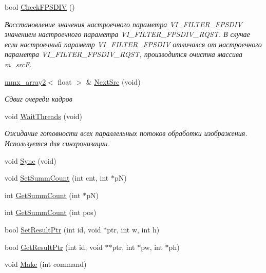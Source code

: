\begin{DoxyCompactItemize}
bool \hyperlink{class_c_v_i_engine_base_a4764b56d4269ed5cd101dddf545e039d}{Check\+F\+P\+S\+D\+I\+V} ()
\begin{DoxyCompactList}\small\item\em Восстановление значения настроечного параметра V\+I\+\_\+\+F\+I\+L\+T\+E\+R\+\_\+\+F\+P\+S\+D\+I\+V значением настроечного параметра V\+I\+\_\+\+F\+I\+L\+T\+E\+R\+\_\+\+F\+P\+S\+D\+I\+V\+\_\+\+R\+Q\+S\+T. В случае если настроечный параметр V\+I\+\_\+\+F\+I\+L\+T\+E\+R\+\_\+\+F\+P\+S\+D\+I\+V отличался от настроечного параметра V\+I\+\_\+\+F\+I\+L\+T\+E\+R\+\_\+\+F\+P\+S\+D\+I\+V\+\_\+\+R\+Q\+S\+T, производится очистка массива m\+\_\+src\+F. \end{DoxyCompactList}\item 
\hyperlink{classmmx__array2}{mmx\+\_\+array2}$<$ float $>$ \& \hyperlink{class_c_v_i_engine_base_aa1aa2604f40dd77bc49ca6ff8fd81535}{Next\+Src} (void)
\begin{DoxyCompactList}\small\item\em Сдвиг очереди кадров \end{DoxyCompactList}\item 
void \hyperlink{class_c_v_i_engine_base_a305c1b2285ddfcdbb021597f0b3dbd39}{Wait\+Threads} (void)
\begin{DoxyCompactList}\small\item\em Ожидание готовности всех параллельных потоков обработки изображения. Используется для синхронизации. \end{DoxyCompactList}\item 
void \hyperlink{class_c_v_i_engine_base_af12866653055639e69a61224615af7fe}{Sync} (void)
\item 
void \hyperlink{class_c_v_i_engine_base_a4b6c77fcb50dcb01f299d7e0f4b05ea6}{Set\+Summ\+Count} (int cnt, int $\ast$p\+N)
\item 
int \hyperlink{class_c_v_i_engine_base_adb6193dca9e4f6c71ad6e77df88bc9f7}{Get\+Summ\+Count} (int $\ast$p\+N)
\item 
int \hyperlink{class_c_v_i_engine_base_a354f23eda839e4aff3b578fc5ad50363}{Get\+Summ\+Count} (int pos)
\item 
bool \hyperlink{class_c_v_i_engine_base_a38d38d266d48fad44435eec46a1086a6}{Set\+Result\+Ptr} (int id, void $\ast$ptr, int w, int h)
\item 
bool \hyperlink{class_c_v_i_engine_base_a99f7df701bfe9d53121e5cd00167e591}{Get\+Result\+Ptr} (int id, void $\ast$$\ast$ptr, int $\ast$pw, int $\ast$ph)
\item 
void \hyperlink{class_c_v_i_engine_base_aa59b55fc315394f4c19cb7d95c399913}{Make} (int command)
$$
\end{DoxyCompactItemize}
